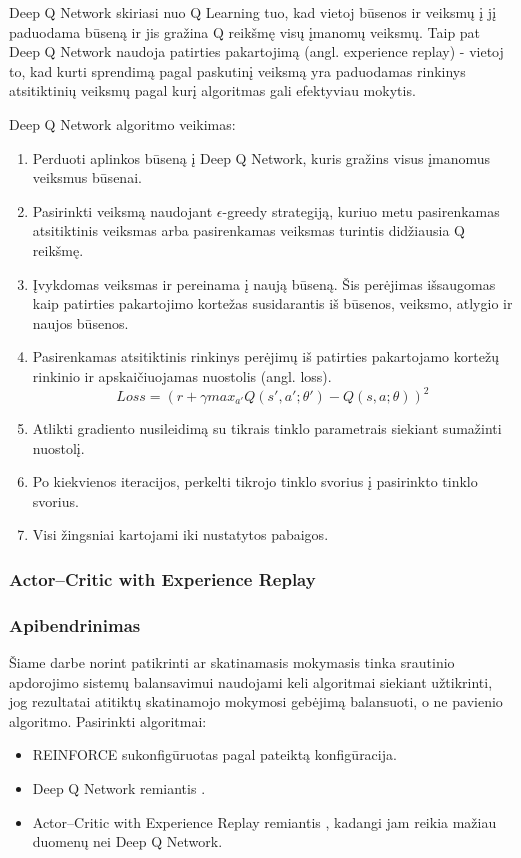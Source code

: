 \documentclass{VUMIFPSbakalaurinis}
\begin{document}
Deep Q Network skiriasi nuo Q Learning tuo, kad vietoj būsenos ir veiksmų į jį paduodama būseną ir jis gražina Q reikšmę visų įmanomų veiksmų. Taip pat Deep Q Network naudoja patirties pakartojimą (angl. experience replay) - vietoj to, kad kurti sprendimą pagal paskutinį veiksmą yra paduodamas rinkinys atsitiktinių veiksmų pagal kurį algoritmas gali efektyviau mokytis. 

Deep Q Network algoritmo veikimas\cite{handson}:
\begin{enumerate}
    \item Perduoti aplinkos būseną į Deep Q Network, kuris gražins visus įmanomus veiksmus būsenai.
    \item Pasirinkti veiksmą naudojant \(\epsilon\)-greedy strategiją, kuriuo metu pasirenkamas atsitiktinis veiksmas arba pasirenkamas veiksmas turintis didžiausia Q reikšmę.
    \item Įvykdomas veiksmas ir pereinama į naują būseną. Šis perėjimas išsaugomas kaip patirties pakartojimo kortežas susidarantis iš būsenos, veiksmo, atlygio ir naujos būsenos.
    \item Pasirenkamas atsitiktinis rinkinys perėjimų iš patirties pakartojamo kortežų rinkinio ir apskaičiuojamas nuostolis (angl. loss). \[Loss=(r + \gamma max_{a'} Q(s',a';\theta') - Q(s,a;\theta))^2\]
    \item Atlikti gradiento nusileidimą su tikrais tinklo parametrais siekiant sumažinti nuostolį.
    \item Po kiekvienos iteracijos, perkelti tikrojo tinklo svorius į pasirinkto tinklo svorius.
    \item Visi žingsniai kartojami iki nustatytos pabaigos.
\end{enumerate}

\subsubsection{Actor–Critic with Experience Replay}

\subsubsection{Apibendrinimas}

Šiame darbe norint patikrinti ar skatinamasis mokymasis tinka srautinio apdorojimo sistemų balansavimui naudojami keli algoritmai siekiant užtikrinti, jog rezultatai atitiktų skatinamojo mokymosi gebėjimą balansuoti, o ne pavienio algoritmo. Pasirinkti algoritmai: 
\begin{itemize}
    \item REINFORCE sukonfigūruotas pagal \cite{williams1992simple} pateiktą konfigūracija.
    \item Deep Q Network remiantis \cite{mnih2015human}.
    \item Actor–Critic with Experience Replay remiantis \cite{wang2016sample}, kadangi jam reikia mažiau duomenų nei Deep Q Network.
\end{itemize}
\end{document}
